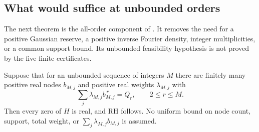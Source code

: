\subsection{What would suffice at unbounded orders}
The next theorem is the all-order component of \cite[\texttt{WEIGHTED\_CANONICAL.md}]{R1003}. It removes the need for a positive Gaussian reserve, a positive inverse Fourier density, integer multiplicities, or a common support bound. Its unbounded feasibility hypothesis is not proved by the five finite certificates.

\begin{theorem}\label{thm:weighted-canonical}
Suppose that for an unbounded sequence of integers $M$ there are finitely many positive real nodes $b_{M,j}$ and positive real weights $\lambda_{M,j}$ with
\begin{equation}\label{eq:weighted-moments}
 \sum_j\lambda_{M,j}b_{M,j}^{\,r}=Q_r,\qquad 2\le r\le M.
\end{equation}
Then every zero of $H$ is real, and RH follows. No uniform bound on node count, support, total weight, or $\sum_j\lambda_{M,j}b_{M,j}$ is assumed.
\end{theorem}

